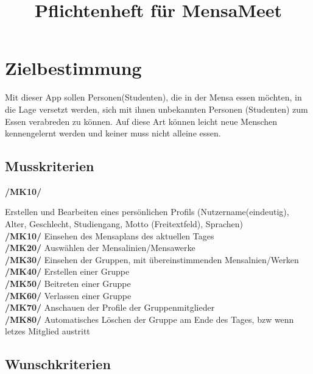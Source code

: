 \documentclass[a4paper]{scrreprt}
\begin{document}
\title{Pflichtenheft für MensaMeet}

\maketitle
 
\tableofcontents
 
\chapter{Zielbestimmung}
Mit dieser App sollen Personen(Studenten), die in der Mensa essen möchten, in die Lage versetzt werden, sich mit ihnen unbekannten Personen (Studenten) zum Essen verabreden zu können. Auf diese Art können leicht neue Menschen kennengelernt werden und keiner muss nicht alleine essen.
 
\section{Musskriterien}

\begin{addmargin}[25pt]{0pt} 
\hypertarget{mk10}{\textbf{/MK10/}} Erstellen und Bearbeiten eines persönlichen Profils (Nutzername(eindeutig), Alter, Geschlecht, Studiengang, Motto (Freitextfeld), Sprachen)\\
\hypertarget{mk10}{\textbf{/MK10/}} Einsehen des Mensaplans des aktuellen Tages\\
\hypertarget{mk20}{\textbf{/MK20/}} Auswählen der Mensalinien/Mensawerke\\
\hypertarget{mk30}{\textbf{/MK30/}} Einsehen der Gruppen, mit übereinstimmenden Mensalnien/Werken\\
\hypertarget{mk40}{\textbf{/MK40/}} Erstellen einer Gruppe\\
\hypertarget{mk50}{\textbf{/MK50/}} Beitreten einer Gruppe\\
\hypertarget{mk60}{\textbf{/MK60/}} Verlassen einer Gruppe\\
\hypertarget{mk70}{\textbf{/MK70/}} Anschauen der Profile der Gruppenmitglieder\\
\hypertarget{mk80}{\textbf{/MK80/}} Automatisches Löschen der Gruppe am Ende des Tages, bzw wenn letzes Mitglied austritt\\
\end{addmargin}

\section{Wunschkriterien}
\end{document}
